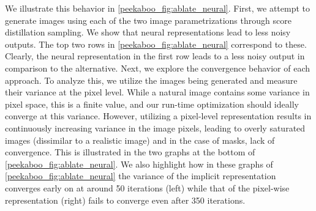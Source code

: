 We illustrate this behavior in \cref{peekaboo_fig:ablate_neural}. First, we attempt to generate images using each of the two image parametrizations through score distillation sampling.  We show that neural representations lead to less noisy outputs. The top two rows in \cref{peekaboo_fig:ablate_neural} correspond to these. Clearly, the neural representation in the first row leads to a less noisy output in comparison to the alternative. Next, we explore the convergence behavior of each approach. To analyze this, we utilize the images being generated and measure their variance at the pixel level. While a natural image contains some variance in pixel space, this is a finite value, and our run-time optimization should ideally converge at this variance. However, utilizing a pixel-level representation results in continuously increasing variance in the image pixels, leading to overly saturated images (dissimilar to a realistic image) and in the case of masks, lack of convergence. This is illustrated in the two graphs at the bottom of \cref{peekaboo_fig:ablate_neural}. We also highlight how in these graphs of \cref{peekaboo_fig:ablate_neural} the variance of the implicit representation converges early on at around 50 iterations (left) while that of the pixel-wise representation (right) fails to converge even after 350 iterations.  


